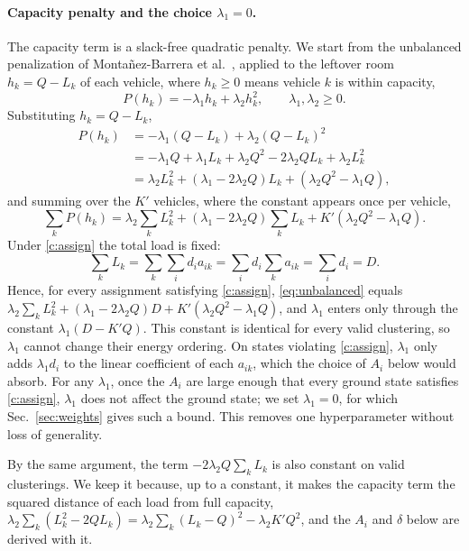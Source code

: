 \documentclass[10pt]{article}
\begin{document}
\paragraph{Capacity penalty and the choice $\lambda_1=0$.}
The capacity term is a slack-free quadratic penalty. We start from the unbalanced penalization of
Monta\~nez-Barrera et al.~\cite{montanez2024unbalanced}, applied to the leftover room $h_k=Q-L_k$ of each vehicle, where $h_k\ge0$ means vehicle $k$ is within capacity,
\begin{equation}
  P(h_k)=-\lambda_1 h_k+\lambda_2 h_k^2,\qquad \lambda_1,\lambda_2\ge 0 .
\end{equation}
Substituting $h_k=Q-L_k$,
\begin{align*}
  P(h_k) &= -\lambda_1(Q-L_k)+\lambda_2(Q-L_k)^2\\
         &= -\lambda_1Q+\lambda_1L_k+\lambda_2Q^2-2\lambda_2QL_k+\lambda_2L_k^2\\
         &= \lambda_2L_k^2+(\lambda_1-2\lambda_2Q)L_k+(\lambda_2Q^2-\lambda_1Q),
\end{align*}
and summing over the $K'$ vehicles, where the constant appears once per vehicle,
\begin{equation}
  \sum_{k}P(h_k)=\lambda_2\sum_k L_k^2+(\lambda_1-2\lambda_2Q)\sum_k L_k+K'(\lambda_2Q^2-\lambda_1Q).
  \label{eq:unbalanced}
\end{equation}
Under \eqref{c:assign} the total load is fixed:
\begin{equation}
  \sum_k L_k=\sum_k\sum_i d_i a_{ik}=\sum_i d_i\sum_k a_{ik}=\sum_i d_i=D .
\end{equation}
Hence, for every assignment satisfying \eqref{c:assign}, \eqref{eq:unbalanced} equals
$\lambda_2\sum_k L_k^2+(\lambda_1-2\lambda_2Q)D+K'(\lambda_2Q^2-\lambda_1Q)$, and $\lambda_1$ enters only through
the constant $\lambda_1(D-K'Q)$. This constant is identical for every valid clustering, so $\lambda_1$ cannot
change their energy ordering. On states violating \eqref{c:assign}, $\lambda_1$ only adds $\lambda_1 d_i$ to the
linear coefficient of each $a_{ik}$, which the choice of $A_i$ below would absorb. For any $\lambda_1$, once the $A_i$ are large enough that every
ground state satisfies \eqref{c:assign}, $\lambda_1$ does not affect the ground state; we set $\lambda_1=0$, for which
Sec.~\ref{sec:weights} gives such a bound. This removes one hyperparameter without loss of generality.

By the same argument, the term $-2\lambda_2Q\sum_kL_k$ is also constant on valid clusterings. We keep it because,
up to a constant, it makes the capacity term the squared distance of each load from full capacity,
$\lambda_2\sum_k(L_k^2-2QL_k)=\lambda_2\sum_k(L_k-Q)^2-\lambda_2K'Q^2$, and the $A_i$ and $\delta$ below are derived with it.
\end{document}

